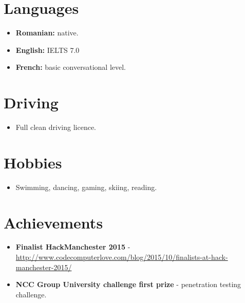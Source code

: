 \documentclass[12pt,a4paper]{res}
\begin{document}
\begin{resume}
\begin{itemize}
  
  \end{itemize}
\vspace{-3mm}

\section{Languages}
\vspace{-0.7mm}
\begin{itemize}
\item[] {\bf Romanian:} native.
\item[] {\bf English:} IELTS 7.0
\item[] {\bf French:} basic conversational level.
\end{itemize}
\vspace{-3mm}

\section{Driving}
\vspace{-0.7mm}
\begin{itemize}
\item[] Full clean driving licence.
\end{itemize}
  \vspace{-3mm}
  
\section{Hobbies}
\vspace{-0.7mm}
  \begin{itemize}
  \item[] Swimming, dancing, gaming, skiing, reading.
  \end{itemize}

\section{\large\bf Achievements}
  \begin{itemize}
  \item {\bf Finalist HackManchester 2015} - \url{http://www.codecomputerlove.com/blog/2015/10/finalists-at-hack-manchester-2015/}
  \item {\bf NCC Group University challenge first prize} - penetration testing challenge.
  \end{itemize}
\end{resume}
\end{document}
